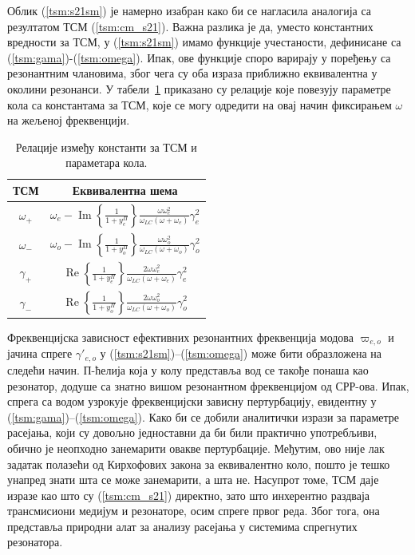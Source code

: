 \documentclass[main.tex]{subfiles}
\begin{document}
Облик (\ref{tsm:s21sm}) је намерно изабран како би се нагласила аналогија са резултатом ТСМ (\ref{tsm:cm_s21}). Важна разлика је да, уместо константних вредности за ТСМ, у (\ref{tsm:s21sm}) имамо функције учестаности, дефинисане са (\ref{tsm:gama})-(\ref{tsm:omega}). Ипак, ове функције споро варирају у поређењу са резонантним члановима, због чега су оба израза приближно еквивалентна у околини резонанси. У табели~\ref{tsm:tabela_ekv} приказано су релације које повезују параметре кола са константама за ТСМ, које се могу одредити на овај начин фиксирањем $\omega$ на жељеној фреквенцији.
\begin{table}[!t]
\renewcommand{\arraystretch}{2.8}
\caption{Релације између константи за ТСМ и параметара кола.}
\label{tsm:tabela_ekv}
\centering
\begin{tabular}{|c|c|}
\hline
ТСМ & Еквивалентна шема \\
\hline
$\omega_+$ & $\omega_{e} - \operatorname{Im}\left\{ \frac{1}{1+y_{e}^\Pi} \right\} \frac{\omega\omega_{e}^2}{\omega_{LC}(\omega + \omega_e)}\gamma_{e}^2$ \\
\hline
$\omega_-$ & $\omega_{o} - \operatorname{Im}\left\{ \frac{1}{1+y_{o}^\Pi} \right\} \frac{\omega\omega_{o}^2}{\omega_{LC}(\omega + \omega_o)}\gamma_{o}^2$ \\
\hline
$\gamma_+$ & $\operatorname{Re}\left\{ \frac{1}{1+y_{e}^\Pi} \right\} \frac{2\omega\omega_{e}^2}{\omega_{LC}(\omega + \omega_e)}\gamma_{e}^2$ \\
\hline
$\gamma_-$ & $\operatorname{Re}\left\{ \frac{1}{1+y_{o}^\Pi} \right\} \frac{2\omega\omega_{o}^2}{\omega_{LC}(\omega + \omega_o)}\gamma_{o}^2$\\
\hline
\end{tabular}
\end{table}

Фреквенцијска зависност ефективних резонантних фреквенција модова $\varpi_{e,o}$ и јачина спреге $\gamma'_{e,o}$ у (\ref{tsm:s21sm})--(\ref{tsm:omega}) може бити образложена на следећи начин. П-ћелија која у колу представља вод се такође понаша као резонатор, додуше са знатно вишом резонантном фреквенцијом од СРР-ова. Ипак, спрега са водом узрокује фреквенцијски зависну пертурбацију, евидентну у (\ref{tsm:gama})--(\ref{tsm:omega}). Како би се добили аналитички изрази за параметре расејања, који су довољно једноставни да би били практично употребљиви, обично је неопходно занемарити овакве пертурбације. Међутим, ово није лак задатак полазећи од Кирхофових закона за еквивалентно коло, пошто је тешко унапред знати шта се може занемарити, а шта не. Насупрот томе, ТСМ даје изразе као што су (\ref{tsm:cm_s21}) директно, зато што инхерентно раздваја трансмисиони медијум и резонаторе, осим спреге првог реда. Због тога, она представља природни алат за анализу расејања у системима спрегнутих резонатора.
\end{document}

